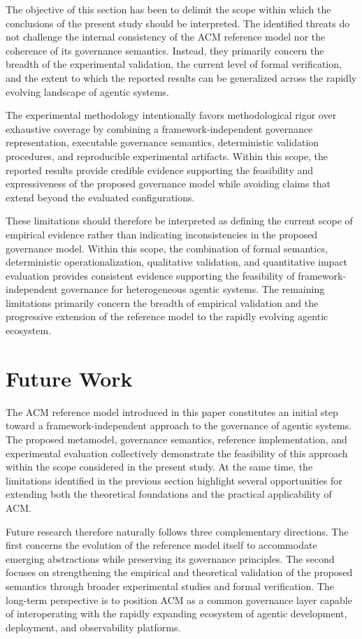 \documentclass[10pt]{article}
\begin{document}
The objective of this section has been to delimit the scope within which the conclusions of the present study should be interpreted. The identified threats do not challenge the internal consistency of the ACM reference model nor the coherence of its governance semantics. Instead, they primarily concern the breadth of the experimental validation, the current level of formal verification, and the extent to which the reported results can be generalized across the rapidly evolving landscape of agentic systems.

The experimental methodology intentionally favors methodological rigor over exhaustive coverage by combining a framework-independent governance representation, executable governance semantics, deterministic validation procedures, and reproducible experimental artifacts. Within this scope, the reported results provide credible evidence supporting the feasibility and expressiveness of the proposed governance model while avoiding claims that extend beyond the evaluated configurations.

These limitations should therefore be interpreted as defining the current scope of empirical evidence rather than indicating inconsistencies in the proposed governance model. Within this scope, the combination of formal semantics, deterministic operationalization, qualitative validation, and quantitative impact evaluation provides consistent evidence supporting the feasibility of framework-independent governance for heterogeneous agentic systems. The remaining limitations primarily concern the breadth of empirical validation and the progressive extension of the reference model to the rapidly evolving agentic ecosystem.

\section{Future Work}
\label{sec:future_work}

The ACM reference model introduced in this paper constitutes an initial step toward a framework-independent approach to the governance of agentic systems. The proposed metamodel, governance semantics, reference implementation, and experimental evaluation collectively demonstrate the feasibility of this approach within the scope considered in the present study. At the same time, the limitations identified in the previous section highlight several opportunities for extending both the theoretical foundations and the practical applicability of ACM.

Future research therefore naturally follows three complementary directions. The first concerns the evolution of the reference model itself to accommodate emerging abstractions while preserving its governance principles. The second focuses on strengthening the empirical and theoretical validation of the proposed semantics through broader experimental studies and formal verification. The long-term perspective is to position ACM as a common governance layer capable of interoperating with the rapidly expanding ecosystem of agentic development, deployment, and observability platforms.
\end{document}
